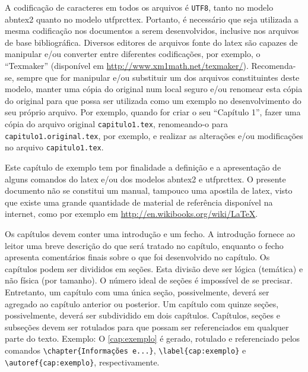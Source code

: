 A codificação de caracteres em todos os arquivos é \texttt{UTF8}, tanto no modelo \gls{abntex2} quanto no modelo \gls{utfprcttex}. Portanto, é necessário que seja utilizada a mesma codificação nos documentos a serem desenvolvidos, inclusive nos arquivos de base bibliográfica. Diversos editores de arquivos fonte do \gls{latex} são capazes de manipular e/ou converter entre diferentes codificações, por exemplo, o ``Texmaker'' (disponível em \url{http://www.xm1math.net/texmaker/}). Recomenda-se, sempre que for manipular e/ou substituir um dos arquivos constituintes deste modelo, manter uma cópia do original num local seguro e/ou renomear esta cópia do original para que possa ser utilizada como um exemplo no desenvolvimento do seu próprio arquivo. Por exemplo, quando for criar o seu ``Capítulo 1'', fazer uma cópia do arquivo original \texttt{capitulo1.tex}, renomeando-o para \texttt{capitulo1.original.tex}, por exemplo, e realizar as alterações e/ou modificações no arquivo \texttt{capitulo1.tex}.

Este capítulo\label{errata:capitulo} de exemplo tem por finalidade a definição e a apresentação de alguns comandos do \gls{latex} e/ou dos modelos \gls{abntex2} e \gls{utfprcttex}. O presente documento não se constitui um manual, tampouco uma apostila de \gls{latex}, visto que existe uma grande quantidade de material de referência disponível na internet, como por exemplo em \url{http://en.wikibooks.org/wiki/LaTeX}.

Os capítulos devem conter uma introdução e um fecho. A introdução fornece ao leitor uma breve descrição do que será tratado no capítulo, enquanto o fecho apresenta comentários finais sobre o que foi desenvolvido no capítulo. Os capítulos podem ser divididos em seções\label{errata:secao}. Esta divisão deve ser lógica (temática) e não física (por tamanho). O número ideal de seções é impossível de se precisar. Entretanto, um capítulo com uma única seção, possivelmente, deverá ser agregado ao capítulo anterior ou posterior. Um capítulo com quinze seções, possivelmente, deverá ser subdividido em dois capítulos. Capítulos, seções e subseções\label{errata:subsecao} devem ser rotulados para que possam ser referenciados em qualquer parte do texto. Exemplo: O \autoref{cap:exemplo} é gerado, rotulado e referenciado pelos comandos \verb|\chapter{Informações e...}|, \verb|\label{cap:exemplo}| e \verb|\autoref{cap:exemplo}|, respectivamente.

